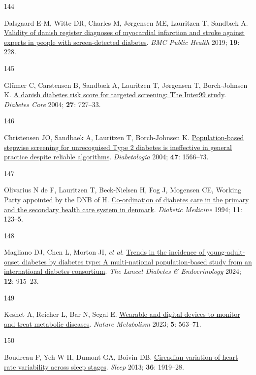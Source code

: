 \documentclass[
  letterpaper,
  headsepline=true,
  open=any]{scrbook}
\newlength{\cslhangindent}
\newlength{\csllabelwidth}
\newlength{\cslentryspacingunit} %
\newenvironment{CSLReferences}[2] %
 {%
  \setlength{\parindent}{0pt}
  \ifodd #1
  \let\oldpar\par
  \def\par{\hangindent=\cslhangindent\oldpar}
  \fi
  \setlength{\parskip}{#2\cslentryspacingunit}
 }%
 {}
\newcommand{\CSLLeftMargin}[1]{\parbox[t]{\csllabelwidth}{#1}}
\newcommand{\CSLRightInline}[1]{\parbox[t]{\linewidth - \csllabelwidth}{#1}\break}
\begin{document}
\begin{CSLReferences}{0}{0}
\leavevmode{}%
\CSLLeftMargin{144 }%
\CSLRightInline{Dalsgaard E-M, Witte DR, Charles M, Jørgensen ME,
Lauritzen T, Sandbæk A.
\href{https://doi.org/10.1186/s12889-019-6549-z}{Validity of danish
register diagnoses of myocardial infarction and stroke against experts
in people with screen-detected diabetes}. \emph{BMC Public Health} 2019;
\textbf{19}: 228.}

\leavevmode{}%
\CSLLeftMargin{145 }%
\CSLRightInline{Glümer C, Carstensen B, Sandbæk A, Lauritzen T,
Jørgensen T, Borch-Johnsen K.
\href{https://doi.org/10.2337/diacare.27.3.727}{A danish diabetes risk
score for targeted screening: The Inter99 study}. \emph{Diabetes Care}
2004; \textbf{27}: 727--33.}

\leavevmode{}%
\CSLLeftMargin{146 }%
\CSLRightInline{Christensen JO, Sandbaek A, Lauritzen T, Borch-Johnsen
K. \href{https://doi.org/10.1007/s00125-004-1496-2}{Population-based
stepwise screening for unrecognised Type 2 diabetes is ineffective in
general practice despite reliable algorithms}. \emph{Diabetologia} 2004;
\textbf{47}: 1566--73.}

\leavevmode{}%
\CSLLeftMargin{147 }%
\CSLRightInline{Olivarius N de F, Lauritzen T, Beck-Nielsen H, Fog J,
Mogensen CE, Working Party appointed by the DNB of H.
\href{https://doi.org/10.1111/j.1464-5491.1994.tb00243.x}{Co-ordination
of diabetes care in the primary and the secondary health care system in
denmark}. \emph{Diabetic Medicine} 1994; \textbf{11}: 123--5.}

\leavevmode{}%
\CSLLeftMargin{148 }%
\CSLRightInline{Magliano DJ, Chen L, Morton JI, \emph{et al.}
\href{https://doi.org/10.1016/S2213-8587(24)00243-2}{Trends in the
incidence of young-adult-onset diabetes by diabetes type: A
multi-national population-based study from an international diabetes
consortium}. \emph{The Lancet Diabetes \& Endocrinology} 2024;
\textbf{12}: 915--23.}

\leavevmode{}%
\CSLLeftMargin{149 }%
\CSLRightInline{Keshet A, Reicher L, Bar N, Segal E.
\href{https://doi.org/10.1038/s42255-023-00778-y}{Wearable and digital
devices to monitor and treat metabolic diseases}. \emph{Nature
Metabolism} 2023; \textbf{5}: 563--71.}

\leavevmode{}%
\CSLLeftMargin{150 }%
\CSLRightInline{Boudreau P, Yeh W-H, Dumont GA, Boivin DB.
\href{https://doi.org/10.5665/sleep.3230}{Circadian variation of heart
rate variability across sleep stages}. \emph{Sleep} 2013; \textbf{36}:
1919--28.}


\end{CSLReferences}
\end{document}
